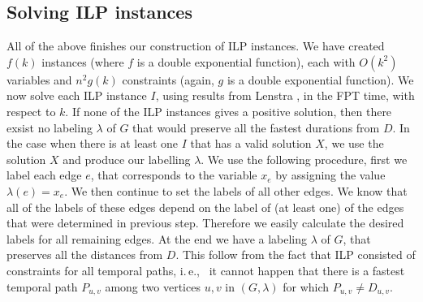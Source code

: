\documentclass[11pt,a4paper]{article}
\theoremstyle{remark}
\theoremstyle{definition}
\newcommand{\ie}{i.\,e.,\ }
\begin{document}
\subsection{Solving ILP instances}
All of the above finishes our construction of ILP instances.
We have created $f(k)$ instances (where $f$ is a double exponential function), 
each with $O(k^2)$ variables and $n^2 g(k)$ constraints (again, $g$ is a double exponential function).
We now solve each ILP instance $I$, using results from Lenstra \cite{Lenstra1983Integer},
in the FPT time, with respect to $k$.
If none of the ILP instances gives a positive solution, then there exsist no labeling $\lambda$ of $G$ that would preserve all the fastest durations from $D$.
In the case when there is at least one $I$ that has a valid solution $X$, 
we use the solution $X$ and produce our labelling $\lambda$.
We use the following procedure,
first we
label each edge $e$, that corresponds to the variable $x_e$
by assigning the value $\lambda(e) = x_e$.
We then continue to set the labels of all other edges. 
We know that all of the labels of these edges depend on the label of (at least one) of the edges that were determined in previous step. 
Therefore we easily calculate the desired labels for all remaining edges.
At the end we have a labeling $\lambda$ of $G$, that preserves all the distances from $D$.
This follow from the fact that ILP consisted of constraints for all temporal paths,
\ie
it cannot happen that there is a fastest temporal path $P_{u,v}$ among two vertices $u,v$ in $(G,\lambda)$ 
for which $P_{u,v} \neq D_{u,v}$.
\end{document}
